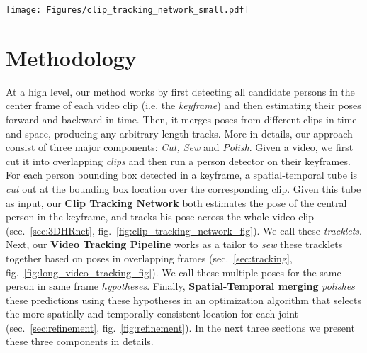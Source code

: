 \documentclass[10pt,twocolumn,letterpaper]{article}
\begin{document}
\begin{figure*}
    \centering
       \texttt{[image: Figures/clip\_tracking\_network\_small.pdf]}
       \vspace{-4mm}
    \caption{\small \it {\bf Clip Tracking Network}. First, (a) our approach runs a person detector on the keyframe of a short video clip. Then, (b) for each detected person it creates a tube by cropping the region within his/her bounding box from all the frames in the clip. Next, (c) each tube is independently fed into our Clip Tracking Network (3D HRNet), which outputs pose estimates for the same person (the one originally detected in the keyframe) in all the frames of the tube. Finally, (d) we reproject the predicted poses on the original images to show how the model can correctly predict poses in all the frames of the clip, by only detecting people in the keyframe. \vspace{-3mm}}
    \label{fig:clip_tracking_network_fig} 
\end{figure*}
\section{Methodology}\label{sec:method}

At a high level, our method works by first detecting all candidate persons in the center frame of each video clip (i.e. the {\it keyframe}) and then estimating their poses forward and backward in time. Then, it merges poses from different clips in time and space, producing any arbitrary length tracks.
More in details, our approach consist of three major components: {\it Cut, Sew} and {\it Polish}. 
Given a video, we first cut it into overlapping {\it clips} and then run a person detector on their keyframes. 
For each person bounding box detected in a keyframe, a spatial-temporal tube is {\it cut} out at the bounding box location over the corresponding clip.
Given this tube as input, our {\bf Clip Tracking Network} both estimates the pose of the central person in the keyframe, and tracks his pose across the whole video clip (sec.~\ref{sec:3DHRnet}, fig.~\ref{fig:clip_tracking_network_fig}).
We call these {\it tracklets}. 
Next, our {\bf Video Tracking Pipeline} works as a tailor to {\it sew} these tracklets together based on poses in overlapping frames (sec.~\ref{sec:tracking}, fig.~\ref{fig:long_video_tracking_fig}). We call these multiple poses for the same person in same frame {\it hypotheses}.
Finally, {\bf Spatial-Temporal merging} {\it polishes} these predictions using these hypotheses in an optimization algorithm that selects the more spatially and temporally consistent location for each joint  (sec.~\ref{sec:refinement}, fig.~\ref{fig:refinement}).
In the next three sections we present these three components in details.
\end{document}
